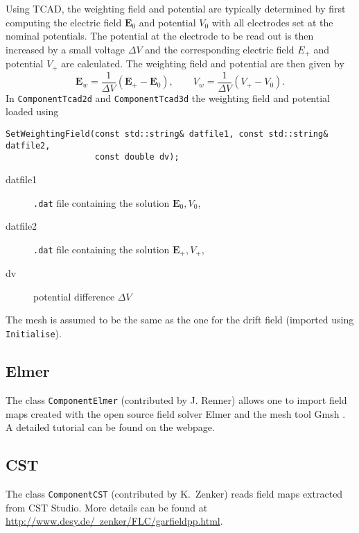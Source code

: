 Using TCAD, the weighting field and potential are typically determined 
by first computing the electric field $\mathbf{E}_{0}$ and potential 
$V_{0}$ with all electrodes set at the nominal potentials.
The potential at the electrode to be read out is then increased by a 
small voltage $\Delta V$ and the corresponding electric field $E_{+}$ and 
potential $V_{+}$ are calculated. The weighting field and potential 
are then given by 
\begin{equation*}
  \mathbf{E}_{w} = \frac{1}{\Delta V}\left(\mathbf{E}_{+} - \mathbf{E}_{0}\right), \qquad V_{w} = \frac{1}{\Delta V}\left(V_{+} - V_{0}\right).
\end{equation*}
In \texttt{ComponentTcad2d} and \texttt{ComponentTcad3d} the weighting 
field and potential loaded using
\begin{lstlisting} 
SetWeightingField(const std::string& datfile1, const std::string& datfile2,
                  const double dv); 
\end{lstlisting}
\begin{description}
  \item[datfile1] \texttt{.dat} file containing the solution $\mathbf{E}_0, V_0$,
  \item[datfile2] \texttt{.dat} file containing the solution $\mathbf{E}_+, V_+$,
  \item[dv] potential difference $\Delta V$
\end{description}
The mesh is assumed to be the same as the one for the drift field 
(imported using \texttt{Initialise}).

\subsection{Elmer}

The class \texttt{ComponentElmer} (contributed by J. Renner) allows one to import 
field maps created with the open source field solver Elmer \cite{Elmer}
and the mesh tool Gmsh \cite{Gmsh}. 
A detailed tutorial can be found on the webpage. 

\subsection{CST}

The class \texttt{ComponentCST} (contributed by K.~Zenker) reads field maps 
extracted from CST Studio. More details can be found at 
\href{http://www.desy.de/~zenker/FLC/garfieldpp.html}{http://www.desy.de/~zenker/FLC/garfieldpp.html}.

